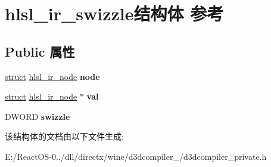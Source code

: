 \hypertarget{structhlsl__ir__swizzle}{}\section{hlsl\+\_\+ir\+\_\+swizzle结构体 参考}
\label{structhlsl__ir__swizzle}
\subsection*{Public 属性}
\begin{DoxyCompactItemize}
\item 
\mbox{\label{structhlsl__ir__swizzle_a8decf8ef4313b00b1b6e69880c391de3}} 
\hyperlink{interfacestruct}{struct} \hyperlink{structhlsl__ir__node}{hlsl\+\_\+ir\+\_\+node} {\bfseries node}
\item 
\mbox{\label{structhlsl__ir__swizzle_a8f1c23ae8a836af4fe21ece08a3ca323}} 
\hyperlink{interfacestruct}{struct} \hyperlink{structhlsl__ir__node}{hlsl\+\_\+ir\+\_\+node} $\ast$ {\bfseries val}
\item 
\mbox{\label{structhlsl__ir__swizzle_a56d8ba083d0d4129553f70399897ae16}} 
D\+W\+O\+RD {\bfseries swizzle}
\end{DoxyCompactItemize}


该结构体的文档由以下文件生成\+:\begin{DoxyCompactItemize}
\item 
E\+:/\+React\+O\+S-\/0../dll/directx/wine/d3dcompiler\+\_/d3dcompiler\+\_\+private.\+h\end{DoxyCompactItemize}
